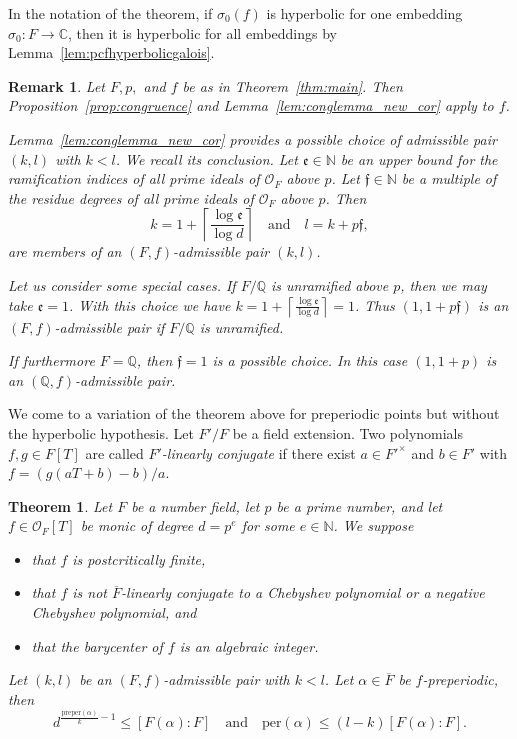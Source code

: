 \documentclass[12pt,oneside,a4]{amsart}
\newcommand{\IC}{\mathbb{C}}
\newcommand{\IN}{\mathbb{N}}
\newcommand{\IQ}{\mathbb{Q}}
\newcommand{\cO}{\mathcal{O}}
\newcounter{maincounter}
\numberwithin{maincounter}{section}
\numberwithin{equation}{section}
\newtheorem{theorem}[maincounter]{Theorem}
\newtheorem{remark}[maincounter]{Remark}
\begin{document}
In the notation of the theorem, if  $\sigma_0(f)$ is hyperbolic for one embedding
$\sigma_0\colon F\rightarrow\IC$, then it is hyperbolic for all
embeddings by Lemma~\ref{lem:pcfhyperbolicgalois}.

\begin{remark}
  \label{rmk:choicekl}
  Let $F,p,$ and $f$ be as in Theorem~\ref{thm:main}.
  Then Proposition~\ref{prop:congruence}
  and  Lemma~\ref{lem:conglemma_new_cor}
  apply to $f$.
  
  Lemma~\ref{lem:conglemma_new_cor} provides a possible choice of admissible pair $(k,l)$
  with $k<l$. We recall its conclusion.
  Let $\mathfrak{e}\in \IN$ be an upper bound for the ramification
  indices of all prime ideals of $\cO_F$ above $p$.
  Let $\mathfrak{f}\in\IN$ be a multiple
  of the residue degrees of all prime ideals of $\cO_F$ above $p$. Then
  \begin{equation*}
    k=1+\left\lceil\frac{\log \mathfrak{e}}{\log
        d}\right\rceil\quad\text{and}\quad
    l = k + p\mathfrak f,
  \end{equation*}
  are members of  an $(F,f)$-admissible pair $(k,l)$. 

  Let us consider some special cases. If $F/\IQ$ is unramified above
  $p$,  then we may take $\mathfrak e=1$.   
  With this choice we have
  $k=1+\left\lceil\frac{\log\mathfrak e}{\log d}\right\rceil =1$. Thus
  $(1,1+p\mathfrak f)$ is an $(F,f)$-admissible pair if $F/\IQ$ is unramified.
  
  If furthermore $F=\IQ$, then $\mathfrak f=1$ is a possible choice.
  In this case $(1,1+p)$ is an $(\IQ,f)$-admissible pair.
\end{remark}



We come to a variation of the theorem above for preperiodic points but
without the hyperbolic hypothesis. Let $F'/F$ be a field extension.
Two polynomials $f,g\in F[T]$ are called \textit{$F'$-linearly
conjugate} if there exist $a\in {F'}^\times$ and $b\in F'$ with $f =
(g(aT+b)-b)/a$.

\begin{theorem}
  \label{thm:mainpreper}
  Let $F$ be a number field, let $p$ be a prime number, and let
  $f\in\cO_F[T]$ be monic of degree $d=p^e$
  for some $e\in\IN$.  We suppose
  \begin{itemize}
  \item that $f$ is postcritically finite,
  \item that $f$ is not $\overline F$-linearly conjugate  to a
    Chebyshev polynomial or a
    negative Chebyshev polynomial, and 
  \item that the barycenter of $f$ is an algebraic integer.
  \end{itemize}
  Let $(k,l)$ be an $(F,f)$-admissible pair with $k<l$. 
  Let $\alpha\in \overline F$ be $f$-preperiodic, then 
  \begin{equation}
    \label{eq:thmpreperbounds}
    d^{\frac{\mathrm{preper}(\alpha)}{k}-1} \le [F(\alpha):F] 
    \quad\text{and}\quad
    \mathrm{per}(\alpha)\le (l-k)[F(\alpha):F].
  \end{equation}
\end{theorem}
\end{document}
